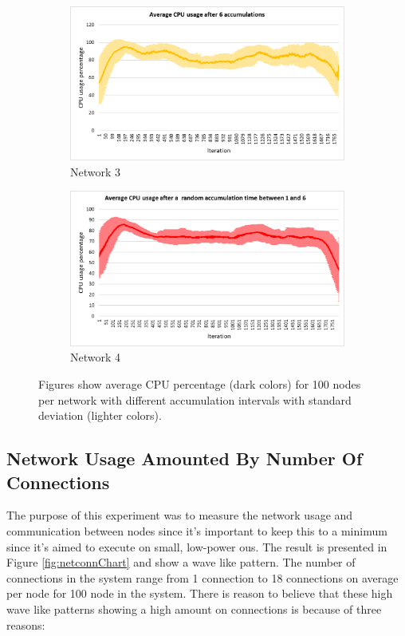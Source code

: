 \documentclass[USenglish]{uit-thesis}
\begin{document}
\begin{figure} [ht]
\begin{subfigure}[b]{0.475\textwidth}
            \centering 
            \includegraphics[width=\textwidth]{CPU_stdev_6.png}
            \caption[]%
            {{\small Network 3}}    
            \label{fig:cpufig3}
        \end{subfigure}
        \quad
        \begin{subfigure}[b]{0.475\textwidth}   
            \centering 
            \includegraphics[width=\textwidth]{CPU_stdev_rand.png}
            \caption[]%
            {{\small Network 4}}    
            \label{fig:cpufig4}
        \end{subfigure}
        \caption[Figures show average CPU percentage for 100 nodes per network with different accumulation intervals with standard deviation.]
        {\small Figures show average CPU percentage (dark colors) for 100 nodes per network with different accumulation intervals with standard deviation (lighter colors).} 
        \label{fig:cpuChart}
\end{figure}


\newpage

\subsection{Network Usage Amounted By Number Of Connections}
The purpose of this experiment was to measure the network usage and communication between nodes since it's important to keep this to a minimum since it's aimed to execute on small, low-power \glspl{ou}. The result is presented in Figure \ref{fig:netconnChart} and show a wave like pattern. The number of connections in the system range from 1 connection to 18 connections on average per node for 100 node in the system.
There is reason to believe that these high wave like patterns showing a high amount on connections is because of three reasons:
\end{document}
